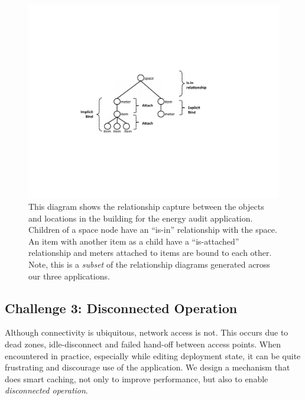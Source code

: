 \begin{figure}[htb!]
\begin{center}
\includegraphics[scale=0.75]{figs/bindattachstructs}
\caption{This diagram shows the relationship capture between the objects and locations in the building for the 
energy audit application.  Children of a space node have an ``is-in'' relationship with the space.  An item
with another item as a child have a ``is-attached'' relationship and meters attached to items are bound to each other.
Note, this is a \emph{subset} of the relationship diagrams generated across our three applications.}
\label{fig:attachandbind}
\end{center}
\end{figure}





\subsection{Challenge 3: Disconnected Operation}
Although connectivity is ubiquitous, network access is not.  This occurs due to dead zones, 
idle-disconnect and failed hand-off between access points.  When encountered in practice, especially while editing
deployment state, it can be quite frustrating and discourage use of the application.  We design a
mechanism that does smart caching, not only to improve performance, but also to enable \emph{disconnected operation}.

